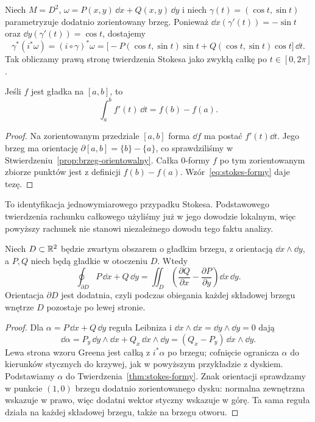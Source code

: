 \begin{przyklad}
Niech $M=D^2$, $\omega=P(x,y)\,\dd x+Q(x,y)\,\dd y$
i niech $\gamma(t)=(\cos t,\sin t)$ parametryzuje
dodatnio zorientowany brzeg. Ponieważ
$\dd x(\gamma'(t))=-\sin t$ oraz
$\dd y(\gamma'(t))=\cos t$, dostajemy
\[
 \gamma^*(i^*\omega)
 =(i\circ\gamma)^*\omega
 =\bigl[-P(\cos t,\sin t)\sin t
       +Q(\cos t,\sin t)\cos t\bigr]\,\dd t.
\]
Tak obliczamy prawą stronę twierdzenia Stokesa
jako zwykłą całkę po $t\in[0,2\pi]$.
\end{przyklad}

\begin{wniosek}
\label{cor:stokes-ftc}
Jeśli $f$ jest gładka na $[a,b]$, to
\[
 \int_a^b f'(t)\,\dd t=f(b)-f(a).
\]
\end{wniosek}
\begin{proof}
Na zorientowanym przedziale $[a,b]$ forma $\dd f$
ma postać $f'(t)\dd t$. Jego brzeg ma orientację
$\partial[a,b]=\{b\}-\{a\}$, co sprawdziliśmy
w Stwierdzeniu~\ref{prop:brzeg-orientowalny}.
Całka $0$-formy $f$ po tym zorientowanym
zbiorze punktów jest z definicji $f(b)-f(a)$.
Wzór~\eqref{eq:stokes-formy} daje tezę.
\end{proof}
To identyfikacja jednowymiarowego przypadku Stokesa.
Podstawowego twierdzenia rachunku całkowego użyliśmy
już w jego dowodzie lokalnym, więc powyższy rachunek
nie stanowi niezależnego dowodu tego faktu analizy.

\begin{wniosek}
\label{cor:stokes-green}
Niech $D\subset\mathbb{R}^2$ będzie zwartym obszarem
o gładkim brzegu, z orientacją $\dd x\wedge\dd y$,
a $P,Q$ niech będą gładkie w otoczeniu $D$. Wtedy
\[
 \oint_{\partial D}P\,\dd x+Q\,\dd y
 =\iint_D\left(\frac{\partial Q}{\partial x}
             -\frac{\partial P}{\partial y}\right)
       \dd x\,\dd y.
\]
Orientacja $\partial D$ jest dodatnia, czyli
podczas obiegania każdej składowej brzegu
wnętrze $D$ pozostaje po lewej stronie.
\end{wniosek}
\begin{proof}
Dla $\alpha=P\,\dd x+Q\,\dd y$ reguła
Leibniza i $\dd x\wedge\dd x
=\dd y\wedge\dd y=0$ dają
\[
 \dd\alpha
 =P_y\,\dd y\wedge\dd x
  +Q_x\,\dd x\wedge\dd y
 =(Q_x-P_y)\,\dd x\wedge\dd y.
\]
Lewa strona wzoru Greena jest całką z
$i^*\alpha$ po brzegu; cofnięcie ogranicza
$\alpha$ do kierunków stycznych do krzywej,
jak w powyższym przykładzie z dyskiem. Podstawiamy $\alpha$ do
Twierdzenia~\ref{thm:stokes-formy}.
Znak orientacji sprawdzamy w punkcie
$(1,0)$ brzegu dodatnio zorientowanego dysku:
normalna zewnętrzna wskazuje w prawo, więc
dodatni wektor styczny wskazuje w górę.
Ta sama reguła działa na każdej składowej
brzegu, także na brzegu otworu.
\end{proof}

